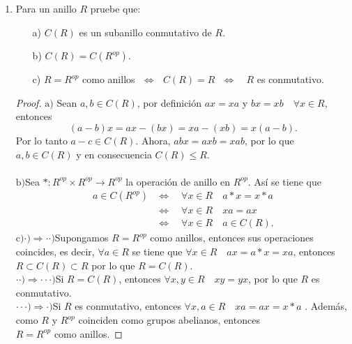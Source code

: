 \documentclass{article}
\theoremstyle{definition}
\theoremstyle{plain}
\theoremstyle{plain}
\theoremstyle{definition}
\theoremstyle{definition}
\theoremstyle{definition}
\theoremstyle{definition}
\theoremstyle{definition}
\theoremstyle{definition}
\begin{document}
\begin{enumerate}[label=\textbf{Ej \arabic*.}]
    \item
    Para un anillo $R$ pruebe que: 
\begin{itemize}
\item[a)] $C(R)$ es un subanillo conmutativo de $R$.
\item[b)] $C(R)=C(R^{op})$.
\item[c)] $R=R^{op}$ como anillos\,\, $\Leftrightarrow$ \,\,$C(R)=R$\,\, $\Leftrightarrow$ \,\, $R$ es conmutativo.
\end{itemize}

\begin{proof}
$\boxed{\text{a)}}$ \quad Sean $a,b\in C(R)$, por definición $ax=xa$ y $bx=xb\quad\forall x\in R$, entonces
\[(a-b)x=ax-(bx)=xa-(xb)=x(a-b).\]
Por lo tanto $a-c\in C(R)$. Ahora, $abx=axb=xab$, por lo que $a,b\in C(R)$ y en consecuencia $C(R)\leq R$.\\\\
$\boxed{\text{b)}}$\quad Sea $*:R^{op}\times R^{op}\to R^{op}$ la operación de anillo en $R^{op}$. Así se tiene que 
\begin{align*}
a\in C(R^{op})
&\Leftrightarrow\quad  \forall x\in R\quad a*x=x*a \\
& \Leftrightarrow\quad \forall x\in R\quad xa=ax\\
&\Leftrightarrow\quad \forall x\in R\quad a\in C(R).
\end{align*}
$\boxed{\text{c)}}$\quad $\boxed{\cdot)\Rightarrow \cdot\cdot)}$\quad Supongamos $R=R^{op}$ como anillos, 
entonces sus operaciones coincides, es decir,
$\forall a\in R$ se tiene que $\forall x\in R\quad ax=a*x=xa$, entonces $R\subset C(R)\subset R$ por lo que $R=C(R)$.\\
 
$\boxed{\cdot\cdot)\Rightarrow \cdot\cdot\cdot)}$\quad Si $R=C(R)$, entonces $\forall x,y\in R\quad xy=yx$, por lo que
 $R$ es conmutativo.\\
  
$\boxed{\cdot\cdot\cdot)\Rightarrow \cdot)}$\quad Si $R$ es conmutativo, entonces $\forall x,a\in R\quad xa=ax=x*a$ .
Además, como $R$ y $R^{op}$ coinciden como grupos abelianos, entonces \\
$R=R^{op}$ como anillos.
\end{proof}


\end{enumerate}
\end{document}
